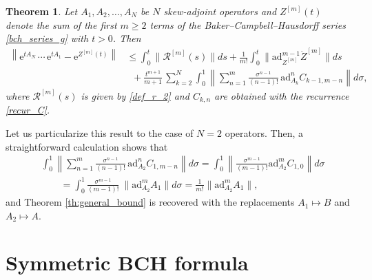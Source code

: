 \documentclass[11pt]{article}
\newcommand{\e}{\ensuremath{\mathrm{e}}}
\newcommand{\ad}{\ensuremath{\mathrm{ad}}}
\newtheorem{theorem}{Theorem}[section]
\begin{document}
\begin{theorem}\label{th:Ng2} 
Let $A_1, A_2, \ldots, A_N$ be $N$ skew-adjoint operators and $Z^{[m]}(t)$ denote the sum of the first $m \ge 2$ 
terms of the Baker--Campbell--Hausdorff series \eqref{bch_series_g} with $t > 0$. Then
\[
\begin{aligned}
    \left\| \e^{t A_N} \, \cdots \, \e^{t A_1} - \e^{Z^{[m]}(t)} \right\| & \le \int_0^t \|  \mathcal{R}^{[m]}(s) \| ds + 
    \frac{1}{m!} \int_0^t \|\ad_{Z^{[m]}}^{m-1} \dot{Z}^{[m]} \| ds  \\
    & \;\; + \frac{t^{m+1}}{m+1} \, \sum_{k=2}^N   \int_0^1 \left\| \sum_{n=1}^m \frac{\sigma^{n-1}}{(n-1)!} \, \ad_{A_k}^n C_{k-1,m-n}  \right\| d \sigma,
\end{aligned}   
\]
where $\mathcal{R}^{[m]}(s)$ is given by \eqref{def_r_2} and $C_{k,n}$ are obtained with the recurrence \eqref{recur_C}.
\end{theorem}   



Let us particularize this result to the case of $N=2$ operators. Then, a straightforward calculation shows that
\[
\begin{aligned}
 &   \int_0^1 \left\| \sum_{n=1}^m \frac{\sigma^{n-1}}{(n-1)!} \, \ad_{A_2}^n C_{1,m-n}  \right\| d \sigma = 
   \int_0^1  \left\| \frac{\sigma^{m-1}}{(m-1)!} \ad_{A_2}^m C_{1,0} \right\| d\sigma \\
 & \qquad   =   \int_0^1  \frac{\sigma^{m-1}}{(m-1)!} \ \| \ad_{A_2}^m A_1\| d\sigma =
  \frac{1}{m!}  \|\ad_{A_2}^m A_1  \|, 
\end{aligned}  
\]
and Theorem \ref{th:general_bound} is recovered with the replacements $A_1 \longmapsto B$ and $A_2 \longmapsto A$.     


\section{Symmetric BCH formula}
\end{document}
